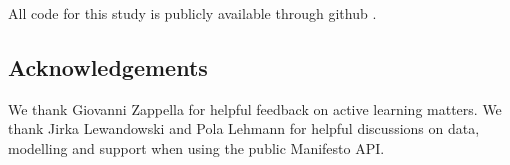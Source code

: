 \documentclass[runningheads,a4paper]{article}
\begin{document}
All code for this study is publicly available through github \cite{active-manifesto-github}.


\subsection*{Acknowledgements}
We thank Giovanni Zappella for helpful feedback on active learning matters. We thank Jirka Lewandowski and Pola Lehmann for helpful discussions on data, modelling and support when using the public Manifesto API.
%
\small{

 
}
\end{document}
